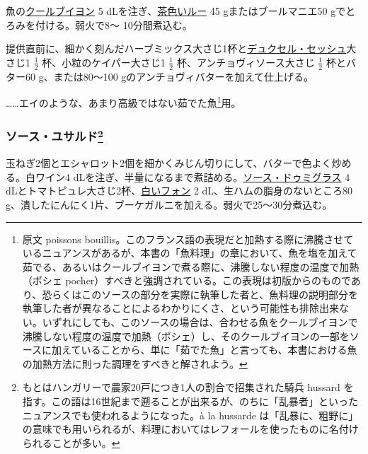 \begin{recette}
魚の\protect\hyperlink{courts-bouillons-de-poisson}{クールブイヨン} 5
dLを注ぎ、\protect\hyperlink{roux-brun}{茶色いルー} 45
gまたはブールマニエ50 gでとろみを付ける。弱火で8〜 10分間煮込む。

提供直前に、細かく刻んだハーブミックス大さじ1杯と\protect\hyperlink{duxelles-seche}{デュクセル・セッシュ}大さじ1
\(\frac{1}{2}\) 杯、小粒のケイパー大さじ1 \(\frac{1}{2}\)
杯、アンチョヴィソース大さじ \(\frac{1}{2}\) 杯とバター60
g、または80〜100 gのアンチョヴィバターを加えて仕上げる。

\ldots{}\ldots{}エイのような、あまり高級ではない茹でた魚\footnote{原文
  poissons
  bouillis。このフランス語の表現だと加熱する際に沸騰させているニュアンスがあるが、本書の「魚料理」の章において、魚を塩を加えて茹でる、あるいはクールブイヨンで煮る際に、沸騰しない程度の温度で加熱（ポシェ
  pocher）すべきと強調されている。この表現は初版からのものであり、恐らくはこのソースの部分を実際に執筆した者と、魚料理の説明部分を執筆した者が異なることによるわかりにくさ、という可能性も排除出来ない。いずれにしても、このソースの場合は、合わせる魚をクールブイヨンで沸騰しない程度の温度で加熱（ポシェ）し、そのクールブイヨンの一部をソースに加えていることから、単に「茹でた魚」と言っても、本書における魚の加熱方法に則った調理をすべきと解されよう。}用。

\atoaki{}

\hypertarget{sauce-hussarde}{%
\subsubsection[ソース・ユサルド]{\texorpdfstring{ソース・ユサルド\footnote{もとはハンガリーで農家20戸につき1人の割合で招集された騎兵
  hussard
  を指す。この語は16世紀まで遡ることが出来るが、のちに「乱暴者」といったニュアンスでも使われるようになった。à
  la hussarde
  は「乱暴に、粗野に」の意味でも用いられるが、料理においてはレフォールを使ったものに名付けられることが多い。}}{ソース・ユサルド}}\label{sauce-hussarde}}


 

玉ねぎ2個とエシャロット2個を細かくみじん切りにして、バターで色よく炒める。白ワイン4
dLを注ぎ、半量になるまで煮詰める。\protect\hyperlink{sauce-demi-glace}{ソース・ドゥミグラス}
4 dLとトマトピュレ大さじ2杯、\protect\hyperlink{fonds-blanc}{白いフォン}
2 dL、生ハムの脂身のないところ80
g、潰したにんにく1片、ブーケガルニを加える。弱火で25〜30分煮込む。


\end{recette}
